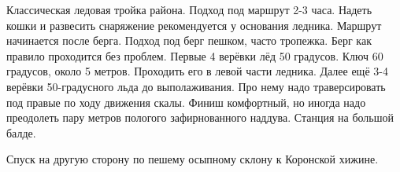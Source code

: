 Классическая ледовая тройка района. Подход под маршрут 2-3 часа.
Надеть кошки и развесить снаряжение рекомендуется у основания ледника.
Маршрут начинается после берга. Подход под берг пешком, часто
тропежка. Берг как правило проходится без проблем. Первые 4 верёвки
лёд 50 градусов. Ключ 60 градусов, около 5 метров. Проходить его в
левой части ледника. Далее ещё 3-4 верёвки 50-градусного льда до
выполаживания. Про нему надо траверсировать под правые по ходу
движения скалы. Финиш комфортный, но иногда надо преодолеть пару
метров пологого зафирнованного наддува. Станция на большой балде.

Спуск на другую сторону по пешему осыпному склону к Коронской хижине.
